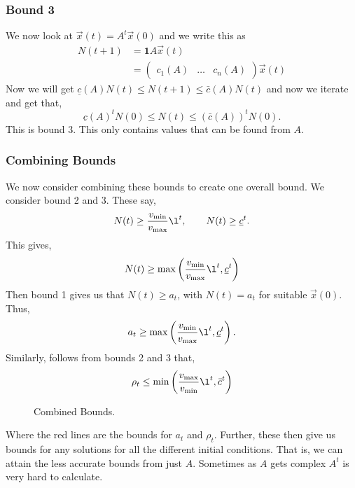 \subsubsection{Bound 3}
We now look at $\vec x(t) = A^t\vec x(0)$ and we write this as
\begin{align*}
  N(t+1) &= \mathbf{1} A\vec x(t)\\
  &= \begin{pmatrix}
    c_1(A) & \dots & c_n(A)
\end{pmatrix} \vec x(t)
\end{align*}
Now we will get $\underline c(A) N(t) \le N(t+1) \le \bar c(A) N(t)$ and now we iterate and get that,
$$ \underline c(A)^t N(0) \le N(t) \le (\bar c(A))^tN(0). $$
This is bound 3. This only contains values that can be found from $A$.
\subsubsection{Combining Bounds}

We now consider combining these bounds to create one overall bound. We consider bound 2 and 3. These say,
$$ N(t) \ge \frac{v_{\text{min}}}{v_{\text{max}}}\l^t, \qquad N(t) \ge \underline c^t. $$
This gives,
$$ N(t) \ge \max\left(\frac{v_{\text{min}}}{v_{\text{max}}}\l^t, \underline c^t \right) $$
Then bound 1 gives us that $N(t) \ge a_t$, with $N(t) = a_t$ for suitable $\vec x(0)$. Thus,
$$ a_t \ge \max\left(\frac{v_{\text{min}}}{v_{\text{max}}}\l^t, \underline c^t \right).$$
Similarly, follows from bounds 2 and 3 that,
$$ \rho_t \le \min\left( \frac{v_{\text{max}}}{v_{\text{min}}}\l^t, \bar c^t \right) $$
\begin{figure}[!ht]
\centering
\resizebox{0.48\textwidth}{!}{}
\caption{Combined Bounds.}
\end{figure}

\noindent
Where the red lines are the bounds for $a_t$ and $\rho_t$. Further, these then give us bounds for any solutions for all the different initial conditions. That is, we can attain the less accurate bounds from just $A$. Sometimes as $A$ gets complex $A^t$ is very hard to calculate.